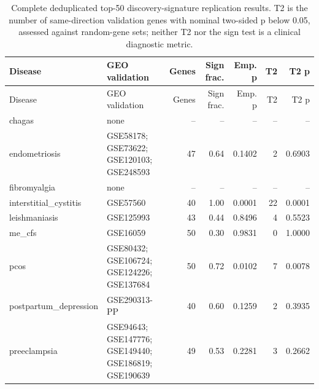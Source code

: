 \begin{longtable}{lp{4.4cm}rrrrr}
\caption{Complete deduplicated top-50 discovery-signature replication results. T2 is the number of same-direction validation genes with nominal two-sided p below 0.05, assessed against random-gene sets; neither T2 nor the sign test is a clinical diagnostic metric.}\\
\hline Disease & GEO validation & Genes & Sign frac. & Emp. p & T2 & T2 p\\\hline\endfirsthead
\hline Disease & GEO validation & Genes & Sign frac. & Emp. p & T2 & T2 p\\\hline\endhead
chagas & none & -- & -- & -- & -- & --\\
endometriosis & GSE58178; GSE73622; GSE120103; GSE248593 & 47 & 0.64 & 0.1402 & 2 & 0.6903\\
fibromyalgia & none & -- & -- & -- & -- & --\\
interstitial\_cystitis & GSE57560 & 40 & 1.00 & 0.0001 & 22 & 0.0001\\
leishmaniasis & GSE125993 & 43 & 0.44 & 0.8496 & 4 & 0.5523\\
me\_cfs & GSE16059 & 50 & 0.30 & 0.9831 & 0 & 1.0000\\
pcos & GSE80432; GSE106724; GSE124226; GSE137684 & 50 & 0.72 & 0.0102 & 7 & 0.0078\\
postpartum\_depression & GSE290313-PP & 40 & 0.60 & 0.1259 & 2 & 0.3935\\
preeclampsia & GSE94643; GSE147776; GSE149440; GSE186819; GSE190639 & 49 & 0.53 & 0.2281 & 3 & 0.2662\\
\hline\end{longtable}
